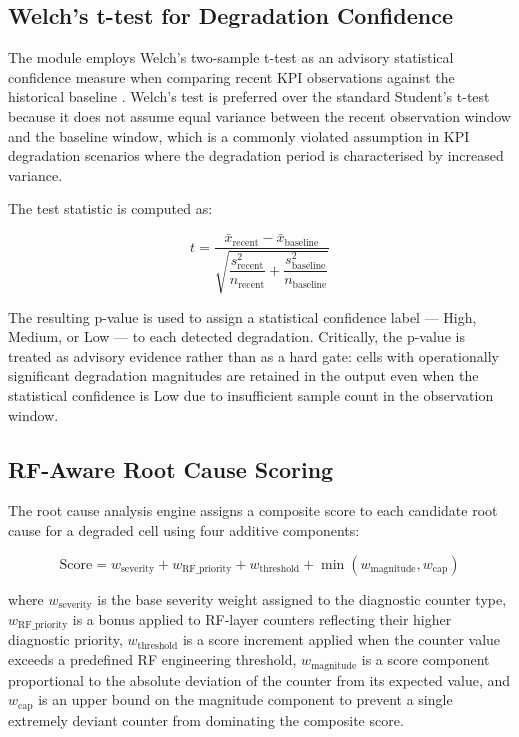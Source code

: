 \subsection{Welch's t-test for Degradation Confidence}

The module employs Welch's two-sample t-test as an advisory statistical confidence measure when comparing recent KPI observations against the historical baseline \cite{montgomery2018}. Welch's test is preferred over the standard Student's t-test because it does not assume equal variance between the recent observation window and the baseline window, which is a commonly violated assumption in KPI degradation scenarios where the degradation period is characterised by increased variance.

The test statistic is computed as:

\begin{equation}
    t = \frac{\bar{x}_{\text{recent}} - \bar{x}_{\text{baseline}}}{\sqrt{\dfrac{s_{\text{recent}}^2}{n_{\text{recent}}} + \dfrac{s_{\text{baseline}}^2}{n_{\text{baseline}}}}}
\end{equation}

The resulting p-value is used to assign a statistical confidence label — High, Medium, or Low — to each detected degradation. Critically, the p-value is treated as advisory evidence rather than as a hard gate: cells with operationally significant degradation magnitudes are retained in the output even when the statistical confidence is Low due to insufficient sample count in the observation window.

\subsection{RF-Aware Root Cause Scoring}

The root cause analysis engine assigns a composite score to each candidate root cause for a degraded cell using four additive components:

\begin{equation}
    \text{Score} = w_{\text{severity}} + w_{\text{RF\_priority}} + w_{\text{threshold}} + \min(w_{\text{magnitude}}, w_{\text{cap}})
\end{equation}

where $w_{\text{severity}}$ is the base severity weight assigned to the diagnostic counter type, $w_{\text{RF\_priority}}$ is a bonus applied to RF-layer counters reflecting their higher diagnostic priority, $w_{\text{threshold}}$ is a score increment applied when the counter value exceeds a predefined RF engineering threshold, $w_{\text{magnitude}}$ is a score component proportional to the absolute deviation of the counter from its expected value, and $w_{\text{cap}}$ is an upper bound on the magnitude component to prevent a single extremely deviant counter from dominating the composite score.

